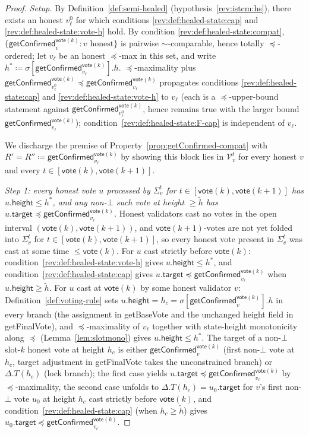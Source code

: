 \ifx\litemode\undefined\documentclass{article}\fi
\newcommand{\V}[0]{\ensuremath{\mathcal{V}}}
\newcommand{\target}{\mathsf{target}}
\newcommand{\height}{\mathsf{height}}
\newcommand{\vote}{\ensuremath{\mathsf{vote}}}
\newcommand{\comm}[1]{\ensuremath{\widetilde{#1}}}
\newcommand{\getBaseVote}{\textsf{getBaseVote}\xspace}
\newcommand{\getFinalVote}{\textsf{getFinalVote}\xspace}
\newcommand{\getConfirmed}{\textsf{getConfirmed}\xspace}
\theoremstyle{plain}
\theoremstyle{definition}
\theoremstyle{remark}
\begin{document}
\begin{proof}
\emph{Setup.}
By Definition~\ref{def:semi-healed} (hypothesis~\ref{rev:istcm:hs}), there exists an honest $v_\ell^0$ for which conditions \ref{rev:def:healed-state:cap} and \ref{rev:def:healed-state:vote-h} hold.
By condition \ref{rev:def:healed-state:compat}, $\{\getConfirmed_v^{\vote(k)} : v \text{ honest}\}$ is pairwise $\sim$-comparable, hence totally $\preceq$-ordered;
let $v_\ell$ be an honest $\preceq$-max in this set, and write $h^\ast \coloneqq \sigma[\getConfirmed_{v_\ell}^{\vote(k)}].h$.
$\preceq$-maximality plus $\getConfirmed_{v_\ell^0}^{\vote(k)} \preceq \getConfirmed_{v_\ell}^{\vote(k)}$ propagates conditions \ref{rev:def:healed-state:cap} and \ref{rev:def:healed-state:vote-h} to $v_\ell$ (each is a $\preceq$-upper-bound statement against $\getConfirmed_{v_\ell^0}^{\vote(k)}$, hence remains true with the larger bound $\getConfirmed_{v_\ell}^{\vote(k)}$);
condition~\ref{rev:def:healed-state:F-cap} is independent of $v_\ell$.

We discharge the premise of Property~\ref{prop:getConfirmed-compat} with $R' = R'' \coloneqq \getConfirmed_{v_\ell}^{\vote(k)}$ by showing this block lies in $\V_v^t$ for every honest $v$ and every $t \in [\vote(k), \vote(k+1)]$.

\emph{Step 1: every honest vote $u$ processed by $\Sigma_v^t$ for $t \in [\vote(k), \vote(k+1)]$ has $u.\height \leq h^\ast$, and any non-$\bot$ such vote at height $\geq \comm{h}$ has $u.\target \preceq \getConfirmed_{v_\ell}^{\vote(k)}$.}
Honest validators cast no votes in the open interval $(\vote(k), \vote(k+1))$, and $\vote(k+1)$-votes are not yet folded into $\Sigma_v^t$ for $t \in [\vote(k), \vote(k+1)]$, so every honest vote present in $\Sigma_v^t$ was cast at some time $\leq \vote(k)$.
For $u$ cast strictly before $\vote(k)$: condition~\ref{rev:def:healed-state:vote-h} gives $u.\height \leq h^\ast$, and condition~\ref{rev:def:healed-state:cap} gives $u.\target \preceq \getConfirmed_{v_\ell}^{\vote(k)}$ when $u.\height \geq \comm{h}$.
For $u$ cast at $\vote(k)$ by some honest validator $v$: Definition~\ref{def:voting-rule} sets $u.\height = h_c = \sigma[\getConfirmed_v^{\vote(k)}].h$ in every branch (the assignment in \getBaseVote{} and the unchanged height field in \getFinalVote{}), and $\preceq$-maximality of $v_\ell$ together with state-height monotonicity along $\preceq$ (Lemma~\ref{lem:slotmono}) gives $u.\height \leq h^\ast$.
The target of a non-$\bot$ slot-$k$ honest vote at height $h_c$ is either $\getConfirmed_v^{\vote(k)}$ (first non-$\bot$ vote at $h_c$, target adjustment in \getFinalVote takes the unconstrained branch) or $\Delta.T(h_c)$ (lock branch); the first case yields $u.\target \preceq \getConfirmed_{v_\ell}^{\vote(k)}$ by $\preceq$-maximality, the second case unfolds to $\Delta.T(h_c) = u_0.\target$ for $v$'s first non-$\bot$ vote $u_0$ at height $h_c$ cast strictly before $\vote(k)$, and condition~\ref{rev:def:healed-state:cap} (when $h_c \geq \comm{h}$) gives $u_0.\target \preceq \getConfirmed_{v_\ell}^{\vote(k)}$.


\end{proof}
\end{document}
